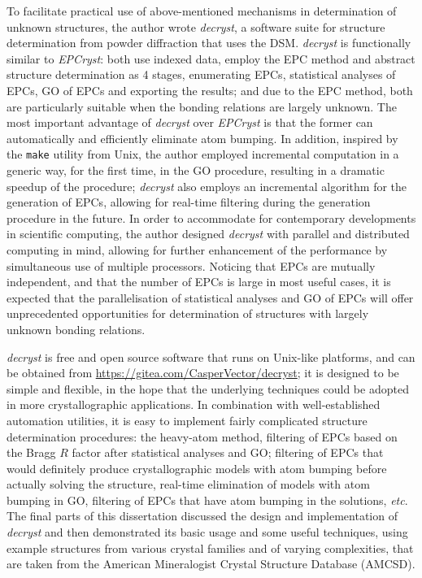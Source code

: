 \begin{eabstract}
	To facilitate practical use of above-mentioned mechanisms in
	determination of unknown structures, the author wrote \emph{decryst},
	a software suite for structure determination from powder diffraction that
	uses the DSM.  \emph{decryst} is functionally similar to \emph{EPCryst}:
	both use indexed data, employ the EPC method and abstract structure
	determination as 4 stages, enumerating EPCs, statistical analyses of EPCs,
	GO of EPCs and exporting the results; and due to the EPC method, both are
	particularly suitable when the bonding relations are largely unknown.
	The most important advantage of \emph{decryst} over \emph{EPCryst} is that
	the former can automatically and efficiently eliminate atom bumping.  In
	addition, inspired by the \verb|make| utility from Unix, the author employed
	incremental computation in a generic way, for the first time, in the GO
	procedure, resulting in a dramatic speedup of the procedure; \emph{decryst}
	also employs an incremental algorithm for the generation of EPCs, allowing
	for real-time filtering during the generation procedure in the future.  In
	order to accommodate for contemporary developments in scientific computing,
	the author designed \emph{decryst} with parallel and distributed computing
	in mind, allowing for further enhancement of the performance by simultaneous
	use of multiple processors.  Noticing that EPCs are mutually independent,
	and that the number of EPCs is large in most useful cases, it is expected
	that the parallelisation of statistical analyses and GO of EPCs will offer
	unprecedented opportunities for determination of structures with largely
	unknown bonding relations.

	\emph{decryst} is free and open source software that
	runs on Unix-like platforms, and can be obtained from
	\url{https://gitea.com/CasperVector/decryst};
	it is designed to be simple and flexible, in the hope that the underlying
	techniques could be adopted in more crystallographic applications.
	In combination with well-established automation utilities, it is easy to
	implement fairly complicated structure determination procedures:
	the heavy-atom method, filtering of EPCs based on the Bragg $R$ factor
	after statistical analyses and GO; filtering of EPCs that would definitely
	produce crystallographic models with atom bumping before actually solving
	the structure, real-time elimination of models with atom bumping in GO,
	filtering of EPCs that have atom bumping in the solutions, \emph{etc}.
	The final parts of this dissertation discussed the design and
	implementation of \emph{decryst} and then demonstrated its basic usage
	and some useful techniques, using example structures from various
	crystal families and of varying complexities, that are taken from the
	American Mineralogist Crystal Structure Database (AMCSD).
\end{eabstract}

